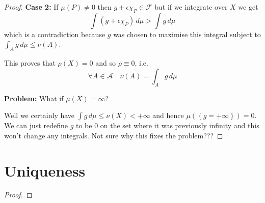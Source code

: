 \documentclass[11pt]{article}
\newcommand{\dm}{\ensuremath{\,d\mu}}
\begin{document}
\begin{proof}
\textbf{Case 2: }If $\mu(P)\neq 0$ then $g+ \epsilon\chi_P \in \mathcal{F}$ but if we integrate over $X$ we get
\[
	\int (g+ \epsilon\chi_P)\dm > \int g \dm
\]
which is a contradiction because $g$ was chosen to maximise this integral subject to $\int_A g \dm \leq \nu (A)$.

This proves that $\rho(X)=0$ and so $\rho\equiv 0$, i.e.
\[
	\forall A \in \mathcal{A} \quad \nu(A) = \int_A g \dm
\]

\textbf{Problem: }What if $\mu(X) = \infty$?

Well we certainly have $\int g \dm \leq \nu (X) < +\infty$ and hence $\mu\left(\left\{g = +\infty\right\}\right)=0$.
We can just redefine $g$ to be $0$ on the set where it was previously infinity and this won't change any integrals.
Not sure why this fixes the problem???
\end{proof}

\section{Uniqueness}
\begin{proof}

\end{proof}
\end{document}
